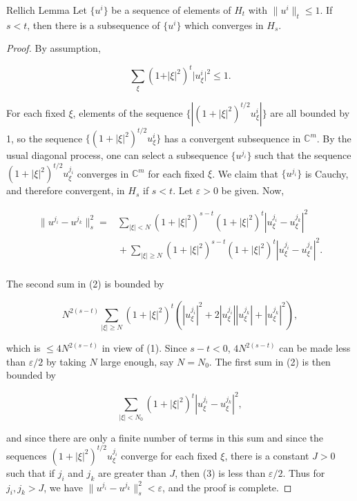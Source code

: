 \begin{lemma}{Rellich Lemma}\label{thm:6.23}
Let  $ \{u^i\} $ be a sequence of elements of  $ H_t $ with  $ \|u^i\|_t \leq 1 $. If  $ s < t $, then there is a subsequence of  $ \{u^i\} $ which converges in  $ H_s $. 
\end{lemma}

\begin{proof}
By assumption,

\begin{equation}
\tag{1}\label{eq:6.23:1}
\sum_{\xi}(1+\vert\xi\vert^{2})^{t}\vert u_{\xi}^{i}\vert^{2}\leq1.
\end{equation}

For each fixed $\xi$, elements of the sequence $\{|(1 + |\xi|^2)^{t/2}u_{\xi}^{i}|\}$ are all bounded by 1, so the sequence $\{(1 + |\xi|^2)^{t/2}u_{\xi}^{i}\}$ has a convergent subsequence in $\mathbb{C}^m$. By the usual diagonal process, one can select a subsequence $\{u^{j_i}\}$ such that the sequence $(1 + |\xi|^2)^{t/2}u_{\xi}^{j_i}$ converges in $\mathbb{C}^m$ for each fixed $\xi$. We claim that $\{u^{j_i}\}$ is Cauchy, and therefore convergent, in $H_s$ if $s < t$. Let $\varepsilon > 0$ be given. Now,

\begin{equation}
\tag{2}\label{eq:6.23:2}
\begin{aligned}{\|u^{j_{i}}-u^{j_{k}}\|_{s}^{2}=}&{{}\sum_{|\xi|<N}(1+|\xi|^{2})^{s-t}(1+|\xi|^{2})^{t}|u_{\xi}^{j_{i}}-u_{\xi}^{j_{k}}|^{2}}\\ {}&{{}+\sum_{|\xi|\geq N}(1+|\xi|^{2})^{s-t}(1+|\xi|^{2})^{t}|u_{\xi}^{j_{i}}-u_{\xi}^{j_{k}}|^{2}.}\\ \end{aligned}
\end{equation}

The second sum in (2) is bounded by

\[
N^{2(s-t)}\sum_{|\xi|\geq N}(1+|\xi|^{2})^{t}(|u_{\xi}^{j_{i}}|^{2}+2|u_{\xi}^{j_{i}}||u_{\xi}^{j_{k}}|+|u_{\xi}^{j_{k}}|^{2}),
\]

which is $\leq4N^{2(s-t)}$ in view of (1). Since $s-t<0$, $4N^{2(s-t)}$ can be made less than $\varepsilon/2$ by taking $N$ large enough, say $N=N_{0}$. The first sum in (2) is then bounded by

\begin{equation}
\tag{3}\label{eq:6.23:3}
\sum_{|\xi|<N_{0}}(1+|\xi|^{2})^{t}|u_{\xi}^{j_{i}}-u_{\xi}^{j_{k}}|^{2},
\end{equation}

and since there are only a finite number of terms in this sum and since the sequences $(1 + |\xi|^2)^{t/2}u_{\xi}^{j_i}$ converge for each fixed $\xi$, there is a constant $J > 0$ such that if $j_i$ and $j_k$ are greater than $J$, then (3) is less than $\varepsilon/2$. Thus for $j_i, j_k > J$, we have $\|u^{j_i} - u^{j_k}\|_s^2 < \varepsilon$, and the proof is complete.

\end{proof}

